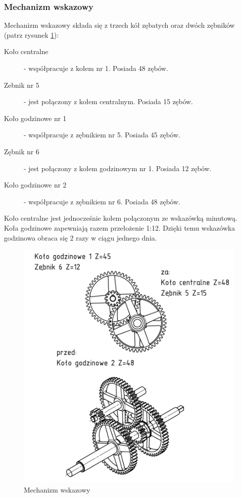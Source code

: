  			\subsubsection{Mechanizm wskazowy} 
  				
  				Mechanizm wskazowy składa się z trzech kół zębatych oraz dwóch zębników (patrz rysunek \ref{fig:mechwskaz}):
  				\begin{description}
  					\item[Koło centralne] - współpracuje z kołem nr 1. Posiada 48 zębów.
  					\item[Zebnik nr 5] - jest połączony z kołem centralnym. Posiada 15 zębów.
  					\item[Koło godzinowe nr 1] - współpracuje z zębnikiem nr 5. Posiada 45 zębów. 
  					\item[Zębnik nr 6] - jest połączony z kołem godzinowym nr 1. Posiada 12 zębów.
  					\item[Koło godzinowe nr 2] - współpracuje z zębnikiem nr 6. Posiada 48 zębów. 
  				\end{description} 
  				Koło centralne jest jednocześnie kołem połączonym ze wskazówką minutową. Koła godzinowe zapewniają razem przełożenie 1:12.
  				Dzięki temu wskazówka godzinowa obraca się 2 razy w ciągu jednego dnia.
  				
  				\begin{figure}
  					\centering
  					\includegraphics[width=\linewidth]{Projekt/mech_wskaz}
  					\caption{Mechanizm wskazowy}
  					\label{fig:mechwskaz}
  				\end{figure}
  				
